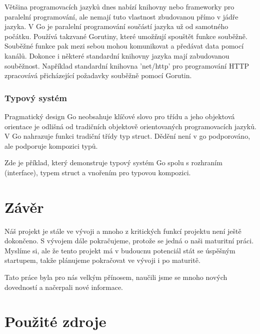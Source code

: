 \documentclass[12pt,a4paper]{article}
\begin{document}
Většina programovacích jazyků dnes nabízí knihovny nebo frameworky pro
paralelní programování, ale nemají tuto vlastnost zbudovanou přímo v jádře
jazyka. V Go je paralelní programování součástí jazyka už od samotného počátku.
Používá takzvané Gorutiny, které umožňují spouštět funkce souběžně. Souběžné
funkce pak mezi sebou mohou komunikovat a předávat data pomocí kanálů. Dokonce
i některé standardní knihovny jazyka mají zabudovanou souběžnost. Například
standardní knihovna 'net/http' pro programování HTTP zpracovává přicházející
požadavky souběžně pomocí Gorutin.

\subsubsection{Typový systém}

Pragmatický design Go neobsahuje klíčové slovo pro třídu a jeho objektová
orientace je odlišná od tradičních objektově orientovaných programovacích
jazyků. V Go nahrazuje funkci tradiční třídy typ struct. Dědění není v go
podporováno, ale podporuje kompozici typů.

Zde je příklad, který demonstruje typový systém Go spolu s rozhraním
(interface), typem struct a vnořením pro typovou kompozici.

\clearpage

\section{Závěr}

Náš projekt je stále ve vývoji a mnoho z kritických funkcí projektu není ještě
dokončeno. S vývojem dále pokračujeme, protože se jedná o naši maturitní práci.
Myslíme si, ale že tento projekt má v budoucnu potenciál stát se úspěšným
startupem, takže plánujeme pokračovat ve vývoji i po maturitě.

Tato práce byla pro nás velkým přínosem, naučili jsme se mnoho nových
dovedností a načerpali nové informace.

\clearpage

\section{Použité zdroje}
\end{document}
